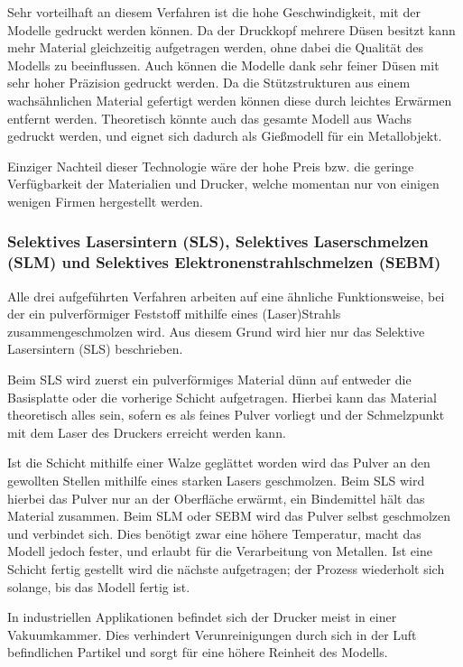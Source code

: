 Sehr vorteilhaft an diesem Verfahren ist die hohe Geschwindigkeit, mit der Modelle gedruckt werden können. Da der Druckkopf mehrere Düsen besitzt kann mehr Material gleichzeitig aufgetragen werden, ohne dabei die Qualität des Modells zu beeinflussen. Auch können die Modelle dank sehr feiner Düsen mit sehr hoher Präzision gedruckt werden. Da die Stützstrukturen aus einem wachsähnlichen Material gefertigt werden können diese durch leichtes Erwärmen entfernt werden. Theoretisch könnte auch das gesamte Modell aus Wachs gedruckt werden, und eignet sich dadurch als Gießmodell für ein Metallobjekt.

Einziger Nachteil dieser Technologie wäre der hohe Preis bzw. die geringe Verfügbarkeit der Materialien und Drucker, welche momentan nur von einigen wenigen Firmen hergestellt werden. \parencite[Informationen aus:][]{DRUCKVERFAHREN,WIKIMJM}

\subsubsection{Selektives Lasersintern (SLS), Selektives Laserschmelzen (SLM) und Selektives Elektronenstrahlschmelzen (SEBM)}

Alle drei aufgeführten Verfahren arbeiten auf eine ähnliche Funktionsweise, bei der ein pulverförmiger Feststoff mithilfe eines (Laser)Strahls zusammengeschmolzen wird. Aus diesem Grund wird hier nur das Selektive Lasersintern (SLS) beschrieben.

Beim SLS wird zuerst ein pulverförmiges Material dünn auf entweder die Basisplatte oder die vorherige Schicht aufgetragen. Hierbei kann das Material theoretisch alles sein, sofern es als feines Pulver vorliegt und der Schmelzpunkt mit dem Laser des Druckers erreicht werden kann.

Ist die Schicht mithilfe einer Walze geglättet worden wird das Pulver an den gewollten Stellen mithilfe eines starken Lasers geschmolzen. Beim SLS wird hierbei das Pulver nur an der Oberfläche erwärmt, ein Bindemittel hält das Material zusammen. Beim SLM oder SEBM wird das Pulver selbst geschmolzen und verbindet sich. Dies benötigt zwar eine höhere Temperatur, macht das Modell jedoch fester, und erlaubt für die Verarbeitung von Metallen.
Ist eine Schicht fertig gestellt wird die nächste aufgetragen; der Prozess wiederholt sich solange, bis das Modell fertig ist.

In industriellen Applikationen befindet sich der Drucker meist in einer Vakuumkammer. Dies verhindert Verunreinigungen durch sich in der Luft befindlichen Partikel und sorgt für eine höhere Reinheit des Modells.

